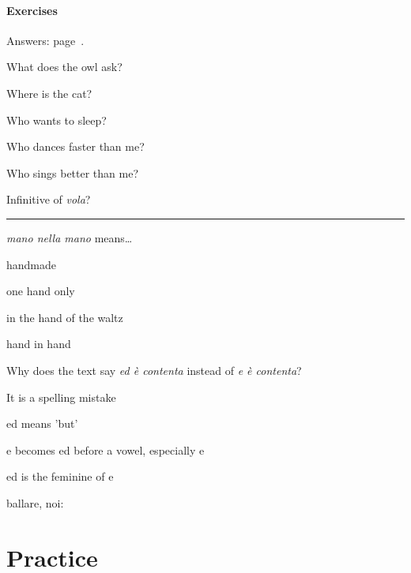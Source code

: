 \documentclass[11pt,a4paper,twoside,openright]{book}
\newcommand{\blank}{\underline{\hspace{2.6cm}}}
\newcommand{\answerline}{\par\vspace{6pt}\noindent\rule{0.75\linewidth}{0.4pt}\par}
\begin{document}
\subsection*{Exercises}
{\color{muted}\small Answers: page~\pageref{ans:rhyme:il-valzer-degli-animali}.}

\begin{exercises}
\item\label{ex:rhyme-valzer-1}\relax What does the owl ask?\par\nopagebreak\begin{options}
\item\relax Where is the cat?
\item\relax Who wants to sleep?
\item\relax Who dances faster than me?
\item\relax Who sings better than me?
\end{options}
\item\label{ex:rhyme-valzer-2}\relax Infinitive of \textit{vola}?\par\answerline
\item\label{ex:rhyme-valzer-3}\relax \textit{mano nella mano} means…\par\nopagebreak\begin{options}
\item\relax handmade
\item\relax one hand only
\item\relax in the hand of the waltz
\item\relax hand in hand
\end{options}
\item\label{ex:rhyme-valzer-4}\relax Why does the text say \textit{ed è contenta} instead of \textit{e è contenta}?\par\nopagebreak\begin{options}
\item\relax It is a spelling mistake
\item\relax ed means 'but'
\item\relax e becomes ed before a vowel, especially e
\item\relax ed is the feminine of e
\end{options}
\item\label{ex:rhyme-valzer-5}\relax ballare, noi: \blank{}
\end{exercises}

\part{Practice}\label{part:practice}
\end{document}
